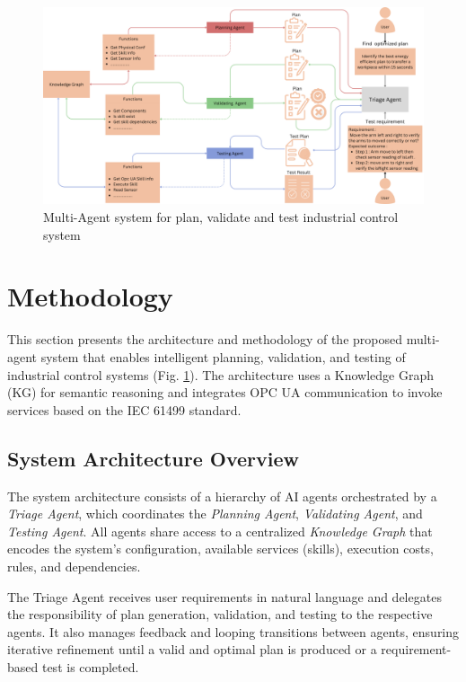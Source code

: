 \begin{bibunit}
    
    
    \begin{figure}
        \includegraphics[width=1\textwidth]{MX_Papers/Paper13/images/arch.png}
        \caption{Multi-Agent system for plan, validate and test industrial control system}
        \label{fig:arch}
    \end{figure}
    
    \section{Methodology}
    \label{methodlogy}
    
    This section presents the architecture and methodology of the proposed multi-agent system that enables intelligent planning, validation, and testing of industrial control systems (Fig. \ref{fig:arch}). The architecture uses a Knowledge Graph (KG) for semantic reasoning and integrates OPC UA communication to invoke services based on the IEC 61499 standard.
    
    \subsection{System Architecture Overview}
    
    The system architecture consists of a hierarchy of AI agents orchestrated by a \textit{Triage Agent}, which coordinates the \textit{Planning Agent}, \textit{Validating Agent}, and \textit{Testing Agent}. All agents share access to a centralized \textit{Knowledge Graph} that encodes the system’s configuration, available services (skills), execution costs, rules, and dependencies.
    
    The Triage Agent receives user requirements in natural language and delegates the responsibility of plan generation, validation, and testing to the respective agents. It also manages feedback and looping transitions between agents, ensuring iterative refinement until a valid and optimal plan is produced or a requirement-based test is completed.
    

\end{bibunit}
